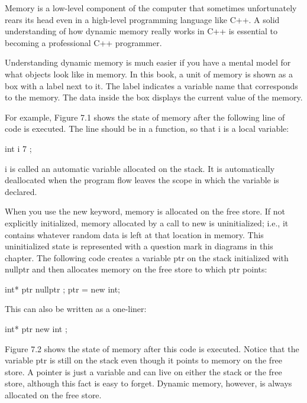 
Memory is a low-level component of the computer that sometimes unfortunately rears its head even in a high-level programming language like C++. A solid understanding of how dynamic memory really works in C++ is essential to becoming a professional C++ programmer.


Understanding dynamic memory is much easier if you have a mental model for what objects look like in memory. In this book, a unit of memory is shown as a box with a label next to it. The label indicates a variable name that corresponds to the memory.
The data inside the box displays the current value of the memory.

For example, Figure 7.1 shows the state of memory after the following line of code is executed. The line should be in a function, so that i is a local variable:

\begin{cpp}
int i { 7 };
\end{cpp}


i is called an automatic variable allocated on the stack. It is automatically deallocated when the program flow leaves the scope in which the variable is declared.

When you use the new keyword, memory is allocated on the free store. If not explicitly initialized, memory allocated by a call to new is uninitialized; i.e., it contains whatever random data is left at that location in memory. This uninitialized state is represented with a question mark in diagrams in this chapter. The following code creates a variable ptr on the stack initialized with nullptr and then allocates memory on the free store to which ptr points:

\begin{cpp}
int* ptr { nullptr };
ptr = new int;
\end{cpp}

This can also be written as a one-liner:

\begin{cpp}
int* ptr { new int };
\end{cpp}


Figure 7.2 shows the state of memory after this code is executed. Notice that the variable ptr is still on the stack even though it points to memory on the free store. A pointer is just a variable and can live on either the stack or the free store, although this fact is easy to forget. Dynamic memory, however, is always allocated on the free store.

